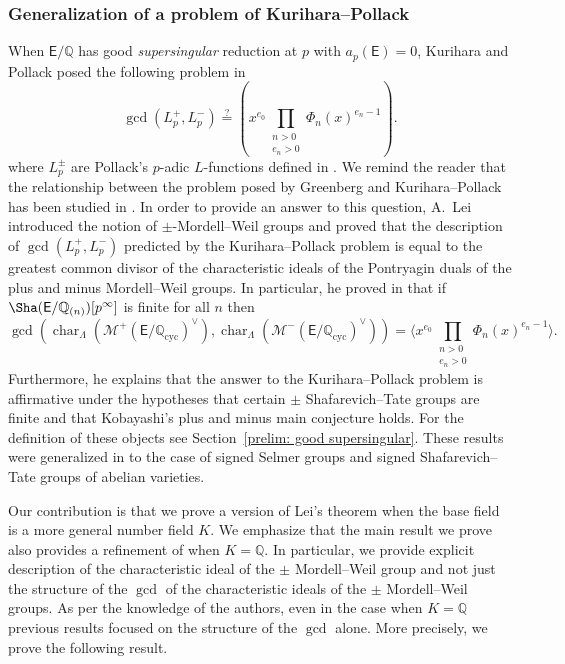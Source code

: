 \documentclass{amsart}
\newcommand{\edit}[1]{\textcolor{black}{#1}}
\numberwithin{equation}{section}
\theoremstyle{remark}
\newcommand{\EC}{\mathsf{E}}
\newcommand{\cM}{\mathcal{M}}
\newcommand{\Q}{\mathbb{Q}}
\newcommand{\cyc}{\operatorname{{cyc}}}
\newcommand{\charac}{\operatorname{char}}
\theoremstyle{plain} %
\begin{document}
\subsubsection*{Generalization of a problem of Kurihara--Pollack}
When $\EC/\Q$ has good \emph{supersingular} reduction at $p$ with $a_p(\EC) = 0$, Kurihara and Pollack posed the following problem in \cite[Problem~3.2]{KP07}
\begin{equation}
\label{KP}\tag{KP}
\gcd(L_p^+, L_p^-)\stackrel{?}{=}\left(x^{e_0}\prod_{\substack{n>0\\ e_n>0}}\Phi_n(x)^{e_n-1}\right).
\end{equation}
where $L_p^{\pm}$ are Pollack’s $p$-adic $L$-functions defined in \cite{Pol03}.
We remind the reader that the relationship between the problem posed by Greenberg and Kurihara--Pollack ha\edit{s} been studied in \cite[Section~3]{KP07}.
In order to provide an answer to this question, A.~Lei introduced the notion of $\pm$-Mordell--Weil groups and proved that the description of $\gcd(L_p^+, L_p^-)$ predicted by the Kurihara--Pollack problem is equal to the greatest common divisor of the characteristic ideals of the Pontryagin duals of the plus and minus Mordell--Weil groups.
In particular, he proved in \cite[Theorem~D]{Lei23} that if $\Sha(\EC/\Q_{(n)})[p^\infty]$ is finite for all $n$ then
\[
\gcd(\charac_{\Lambda}(\cM^+(\EC/\Q_{\cyc})^\vee), \charac_{\Lambda}(\cM^-(\EC/\Q_{\cyc})^\vee) )= \Bigg\langle x^{e_0}\prod_{\substack{n>0\\ e_n>0}}\Phi_n(x)^{e_n-1} \Bigg\rangle.
\]
Furthermore, he explains that the answer to the Kurihara--Pollack problem is affirmative under the hypotheses that certain $\pm$ Shafarevich--Tate groups are finite and that Kobayashi’s plus and minus main conjecture holds.
For the definition of these objects see Section~\ref{prelim: good supersingular}.
These results were generalized in \cite{Ray23} to the case of signed Selmer groups and signed Shafarevich--Tate groups of abelian varieties.

Our contribution is that we prove a version of Lei's theorem when the base field is a more general number field $K$.
We emphasize that the main result we prove also provides a refinement of \cite[Theorem~D]{Lei23} when $K=\Q$.
In particular, we provide explicit description of the characteristic ideal of the $\pm$ Mordell--Weil group and not just the structure of the $\gcd$ of the characteristic ideals of the $\pm$ Mordell--Weil groups.
As per the knowledge of the authors, even in the case when $K=\Q$ previous results focused on the structure of the $\gcd$ alone.
More precisely, we prove the following result.
\end{document}
